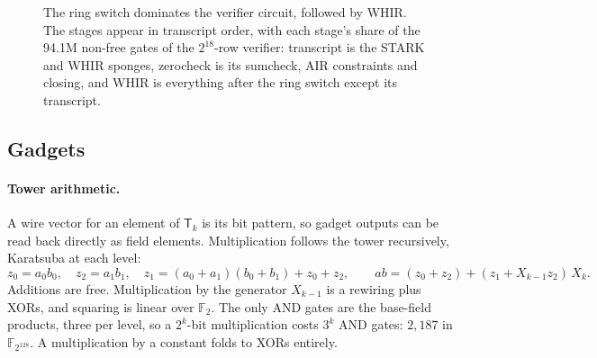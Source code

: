 \documentclass[11pt]{article}
\newcommand{\F}{\mathbb{F}_{2^{128}}}
\newcommand{\T}{\mathsf{T}}
\newcommand{\AND}{\textsf{AND}}
\newcommand{\XOR}{\textsf{XOR}}
\begin{document}
\begin{figure}[t]\centering
{}
\caption{The ring switch dominates the verifier circuit, followed by WHIR. The
stages appear in transcript order, with each stage's share of the 94.1M non-free
gates of the $2^{18}$-row verifier: transcript is the STARK and WHIR sponges,
zerocheck is its sumcheck, AIR constraints and closing, and WHIR is everything
after the ring switch except its transcript.}
\label{fig:pipeline}
\end{figure}

\subsection{Gadgets}\label{sec:gadgets}

\paragraph{Tower arithmetic.} A wire vector for an element of $\T_k$ is its
bit pattern, so gadget outputs can be read back directly as field elements.
Multiplication follows the tower recursively, Karatsuba at each level:
\[
  z_0=a_0b_0,\quad z_2=a_1b_1,\quad z_1=(a_0+a_1)(b_0+b_1)+z_0+z_2,\qquad
  ab=(z_0+z_2)+(z_1+X_{k-1}z_2)\,X_k .
\]
Additions are free. Multiplication by the generator $X_{k-1}$ is a rewiring plus
\XOR{}s, and squaring is linear over $\mathbb{F}_2$. The only \AND{} gates are
the base-field products, three per level, so a $2^k$-bit multiplication costs
$3^k$ \AND{} gates: $2{,}187$ in $\F$. A multiplication by a constant folds to
\XOR{}s entirely.
\end{document}
